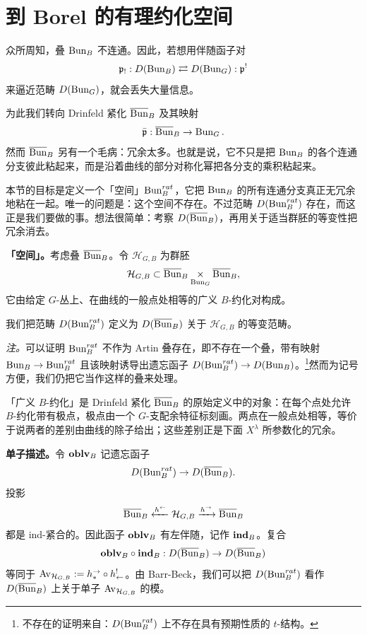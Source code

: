 \section{到 Borel 的有理约化空间}

众所周知，叠 $\operatorname{Bun}_B$ 不连通。因此，若想用伴随函子对
\[
  \mathfrak{p}_! : D(\operatorname{Bun}_B)\rightleftarrows D(\operatorname{Bun}_G) : \mathfrak{p}^!
\]
来逼近范畴 $D(\operatorname{Bun}_G)$，就会丢失大量信息。

为此我们转向 Drinfeld 紧化 $\overline{\mathrm{Bun}}_B$ 及其映射
\[
  \bar{\mathfrak{p}} : \overline{\mathrm{Bun}}_B \to \operatorname{Bun}_G .
\]
然而 $\overline{\mathrm{Bun}}_B$ 另有一个毛病：冗余太多。也就是说，它不只是把 $\operatorname{Bun}_B$ 的各个连通分支彼此粘起来，而是沿着曲线的部分对称化幂把各分支的乘积粘起来。

本节的目标是定义一个「空间」$\operatorname{Bun}^{rat}_B$，它把 $\operatorname{Bun}_B$ 的所有连通分支真正无冗余地粘在一起。唯一的问题是：这个空间不存在。不过范畴 $D(\operatorname{Bun}^{rat}_B)$ 存在，而这正是我们要做的事。想法很简单：考察 $D(\overline{\mathrm{Bun}}_B)$，再用关于适当群胚的等变性把冗余消去。

\textbf{「空间」。}考虑叠 $\overline{\mathrm{Bun}}_B$。令 $\mathcal H_{G,B}$ 为群胚
\[
  \mathcal H_{G,B}\subset \overline{\mathrm{Bun}}_B\underset{\operatorname{Bun}_G}{\times}\overline{\mathrm{Bun}}_B ,
\]
它由给定 $G$-丛上、在曲线的一般点处相等的广义 $B$-约化对构成。

我们把范畴 $D(\operatorname{Bun}^{rat}_B)$ 定义为 $D(\overline{\mathrm{Bun}}_B)$ 关于 $\mathcal H_{G,B}$ 的等变范畴。

\emph{注。}可以证明 $\operatorname{Bun}^{rat}_B$ 不作为 Artin 叠存在，即不存在一个叠，带有映射 $\operatorname{Bun}_B\to\operatorname{Bun}^{rat}_B$ 且该映射诱导出遗忘函子 $D(\operatorname{Bun}^{rat}_B)\to D(\operatorname{Bun}_B)$。\footnote{不存在的证明来自：$D(\operatorname{Bun}^{rat}_B)$ 上不存在具有预期性质的 $t$-结构。}然而为记号方便，我们仍把它当作这样的叠来处理。

\begin{annote}
「广义 $B$-约化」是 Drinfeld 紧化 $\overline{\mathrm{Bun}}_B$ 的原始定义中的对象：在每个点处允许 $B$-约化带有极点，极点由一个 $G$-支配余特征标刻画。两点在一般点处相等，等价于说两者的差别由曲线的除子给出；这些差别正是下面 $X^\lambda$ 所参数化的冗余。\par\vspace{0.15em}{\raggedleft 【来源：原书 p.2 §1.1（A）；[GL:contr] 的引言（A）】\par}
\end{annote}

\textbf{单子描述。}令 $\mathbf{oblv}_B$ 记遗忘函子
\[
  D(\operatorname{Bun}^{rat}_B)\to D(\overline{\mathrm{Bun}}_B).
\]
投影
\[
  \overline{\mathrm{Bun}}_B\xleftarrow{h^\leftarrow}\mathcal H_{G,B}\xrightarrow{h^\rightarrow}\overline{\mathrm{Bun}}_B
\]
都是 ind-紧合的。因此函子 $\mathbf{oblv}_B$ 有左伴随，记作 $\mathbf{ind}_B$。复合
\[
  \mathbf{oblv}_B\circ\mathbf{ind}_B : D(\overline{\mathrm{Bun}}_B)\to D(\overline{\mathrm{Bun}}_B)
\]
等同于 $\mathrm{Av}_{\mathcal H_{G,B}} := h^\rightarrow_*\circ h^!_\leftarrow$。由 Barr-Beck，我们可以把 $D(\operatorname{Bun}^{rat}_B)$ 看作 $D(\overline{\mathrm{Bun}}_B)$ 上关于单子 $\mathrm{Av}_{\mathcal H_{G,B}}$ 的模。

